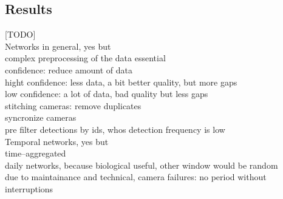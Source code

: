\subsection{Results}
[TODO]\\

Networks in general, yes but\\
complex preprocessing of the data essential\\
confidence: reduce amount of data\\
hight confidence: less data, a bit better quality, but more gaps\\
low confidence: a lot of data, bad quality but less gaps\\
stitching cameras: remove duplicates\\
syncronize cameras\\
pre filter detections by ids, whos detection frequency is low\\

Temporal networks, yes but\\
time--aggregated\\
daily networks, because biological useful, other window would be random\\
due to maintainance and technical, camera failures: no period without interruptions\\

